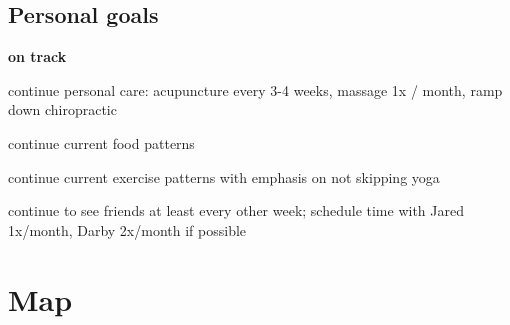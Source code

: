\documentclass[12pt,twoside]{article}
\begin{document}
\subsection{Personal goals}
\textbf{on track}
\begin{compactitem}
\item continue personal care: acupuncture every 3-4 weeks, massage 1x / month, ramp down chiropractic
\item continue current food patterns
\item continue current exercise patterns with emphasis on not skipping yoga
\item continue to see friends at least every other week; schedule time with Jared 1x/month, Darby 2x/month if possible
\end{compactitem}


\section{Map}
\end{document}
